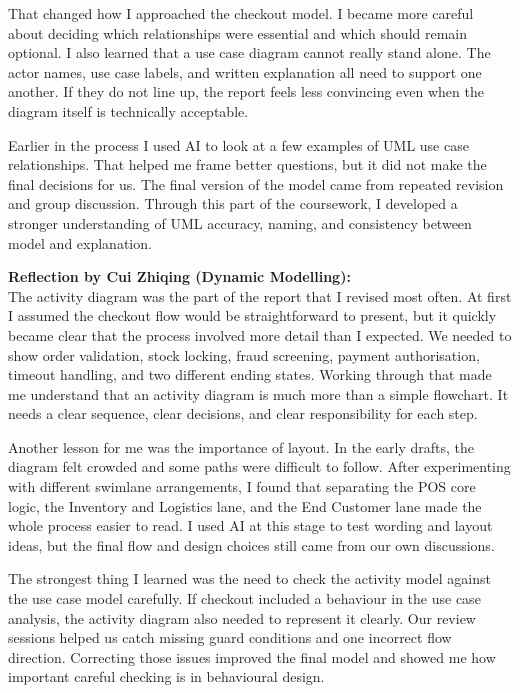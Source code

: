 \documentclass[11pt,a4paper]{article}
\begin{document}
That changed how I approached the checkout model. I became more careful about deciding which relationships were essential and which should remain optional. I also learned that a use case diagram cannot really stand alone. The actor names, use case labels, and written explanation all need to support one another. If they do not line up, the report feels less convincing even when the diagram itself is technically acceptable.

Earlier in the process I used AI to look at a few examples of UML use case relationships. That helped me frame better questions, but it did not make the final decisions for us. The final version of the model came from repeated revision and group discussion. Through this part of the coursework, I developed a stronger understanding of UML accuracy, naming, and consistency between model and explanation.

\bigskip
\textbf{Reflection by Cui Zhiqing (Dynamic Modelling):} \\
The activity diagram was the part of the report that I revised most often. At first I assumed the checkout flow would be straightforward to present, but it quickly became clear that the process involved more detail than I expected. We needed to show order validation, stock locking, fraud screening, payment authorisation, timeout handling, and two different ending states. Working through that made me understand that an activity diagram is much more than a simple flowchart. It needs a clear sequence, clear decisions, and clear responsibility for each step.

Another lesson for me was the importance of layout. In the early drafts, the diagram felt crowded and some paths were difficult to follow. After experimenting with different swimlane arrangements, I found that separating the POS core logic, the Inventory and Logistics lane, and the End Customer lane made the whole process easier to read. I used AI at this stage to test wording and layout ideas, but the final flow and design choices still came from our own discussions.

The strongest thing I learned was the need to check the activity model against the use case model carefully. If checkout included a behaviour in the use case analysis, the activity diagram also needed to represent it clearly. Our review sessions helped us catch missing guard conditions and one incorrect flow direction. Correcting those issues improved the final model and showed me how important careful checking is in behavioural design.
\end{document}
